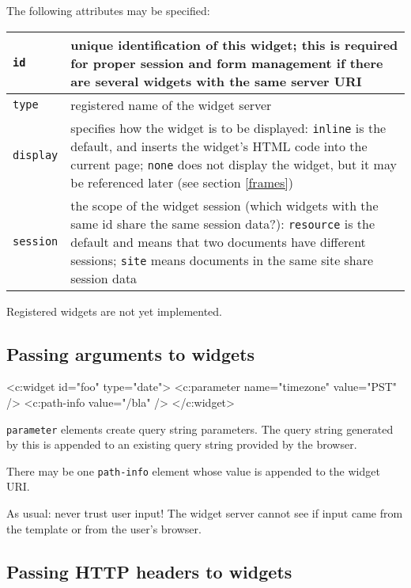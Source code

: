 \documentclass[a4paper,12pt]{article}
\begin{document}
The following attributes may be specified:

\begin{tabular}{|l|p{8cm}|}
\hline
\texttt{id} & unique identification of this widget; this is required
for proper session and form management if there are several widgets
with the same server URI \\
\hline
\texttt{type} & registered name of the widget server \\

\hline

\texttt{display} & specifies how the widget is to be displayed:
\texttt{inline} is the default, and inserts the widget's HTML code
into the current page; \texttt{none} does not display the widget, but
it may be referenced later (see section \ref{frames}) \\

\hline
\texttt{session} & the scope of the widget session (which widgets with
the same id share the same session data?): \texttt{resource} is the
default and means that two documents have different sessions;
\texttt{site} means documents in the same site share session data \\

\hline
\end{tabular}

Registered widgets are not yet implemented.

\subsection{Passing arguments to widgets}

\begin{verbatim*}
<c:widget id="foo" type="date">
  <c:parameter name="timezone" value="PST" />
  <c:path-info value="/bla" />
</c:widget>
\end{verbatim*}

\texttt{parameter} elements create query string parameters.  The query
string generated by this is appended to an existing query string
provided by the browser.

There may be one \texttt{path-info} element whose value is appended to
the widget URI.

As usual: never trust user input!  The widget server cannot see if
input came from the template or from the user's browser.

\subsection{Passing HTTP headers to widgets}
\end{document}
